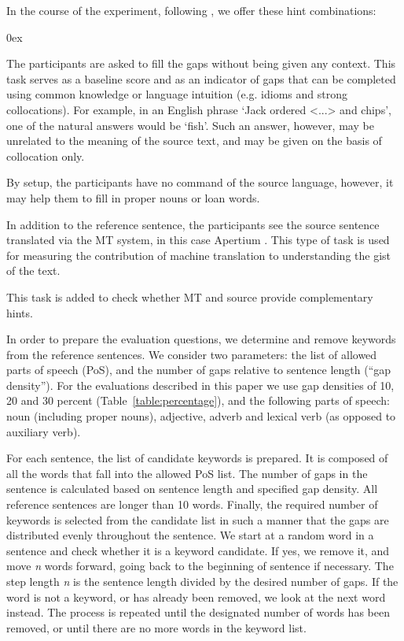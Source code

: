 \documentclass[11pt]{article}
\newcommand{\comment}[1]{}
\begin{document}
In the course of the experiment, following \cite{oregan13}, we offer these hint combinations:
\begin{description}\itemsep 0ex
\item[Reference sentence only:] The participants are asked to fill the gaps without being given
any context. This task serves as a baseline score and as an indicator of gaps
that can be completed using common knowledge or language intuition (e.g.
idioms and strong collocations). For example, in an English phrase `Jack ordered <...> and chips', one of the natural answers would be `fish'. Such an answer, however, may be unrelated to the meaning of the source text, and may be given on the basis of collocation only.
\item[Reference sentence and source sentence:] By setup, the
participants have no command of the source language, however, it may help them to fill
in proper nouns or loan words.
\item[Reference sentence and MT hint:] In addition to the reference sentence, the
participants see the source sentence translated via the MT system, in this case Apertium \citep{forcada11}. This type of task is
used for measuring the contribution of machine translation to understanding the
gist of the text.
\item[Reference sentence and both hints:] This task is
added to check whether MT and source provide complementary hints.
\end{description}

In order to prepare the evaluation questions, we determine and remove keywords from the 
reference sentences. We consider two parameters: the list of allowed parts of speech (PoS), and the 
number of gaps relative to sentence length (``gap density''). For the evaluations described in 
this paper we use gap densities of 10, 20 and 30 percent (Table~\ref{table:percentage}), and the following parts of speech: noun (including proper nouns), adjective, adverb and lexical verb (as opposed to auxiliary verb).

For each sentence, the list of candidate keywords is prepared. It is composed of all the words that 
fall into the allowed PoS list. The number of gaps in the sentence is calculated based on 
sentence length and specified gap density. All reference sentences are longer than 10 words. Finally, the required number of keywords is selected 
from the candidate list in such a manner that the gaps are distributed evenly throughout the sentence. We start at a random word in a sentence and check whether it is a keyword candidate. If yes, we remove it, and move \emph{n} words forward, going back to the beginning of sentence if necessary. The step length \emph{n} is the sentence length divided by the desired number of gaps. If the word is not a keyword, or has already been removed, we look at the next word instead. The process is repeated until the designated number of words has been removed, or until there are no more words in the keyword list.
\end{document}
